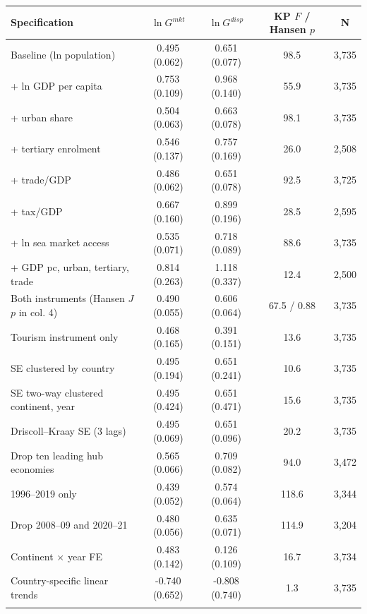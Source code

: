 \begin{tabular}{lcccc}
\toprule
Specification & $\ln G^{mkt}$ & $\ln G^{disp}$ & KP $F$ / Hansen $p$ & N \\
\midrule
Baseline (ln population) & 0.495\sym{***} (0.062) & 0.651\sym{***} (0.077) & 98.5 & 3,735 \\
+ ln GDP per capita & 0.753\sym{***} (0.109) & 0.968\sym{***} (0.140) & 55.9 & 3,735 \\
+ urban share & 0.504\sym{***} (0.063) & 0.663\sym{***} (0.078) & 98.1 & 3,735 \\
+ tertiary enrolment & 0.546\sym{***} (0.137) & 0.757\sym{***} (0.169) & 26.0 & 2,508 \\
+ trade/GDP & 0.486\sym{***} (0.062) & 0.651\sym{***} (0.078) & 92.5 & 3,725 \\
+ tax/GDP & 0.667\sym{***} (0.160) & 0.899\sym{***} (0.196) & 28.5 & 2,595 \\
+ ln sea market access & 0.535\sym{***} (0.071) & 0.718\sym{***} (0.089) & 88.6 & 3,735 \\
+ GDP pc, urban, tertiary, trade & 0.814\sym{***} (0.263) & 1.118\sym{***} (0.337) & 12.4 & 2,500 \\
Both instruments (Hansen $J$ $p$ in col. 4) & 0.490\sym{***} (0.055) & 0.606\sym{***} (0.064) & 67.5 / 0.88 & 3,735 \\
Tourism instrument only & 0.468\sym{***} (0.165) & 0.391\sym{***} (0.151) & 13.6 & 3,735 \\
SE clustered by country & 0.495\sym{**} (0.194) & 0.651\sym{***} (0.241) & 10.6 & 3,735 \\
SE two-way clustered continent, year & 0.495 (0.424) & 0.651 (0.471) & 15.6 & 3,735 \\
Driscoll--Kraay SE (3 lags) & 0.495\sym{***} (0.069) & 0.651\sym{***} (0.096) & 20.2 & 3,735 \\
Drop ten leading hub economies & 0.565\sym{***} (0.066) & 0.709\sym{***} (0.082) & 94.0 & 3,472 \\
1996--2019 only & 0.439\sym{***} (0.052) & 0.574\sym{***} (0.064) & 118.6 & 3,344 \\
Drop 2008--09 and 2020--21 & 0.480\sym{***} (0.056) & 0.635\sym{***} (0.071) & 114.9 & 3,204 \\
Continent $\times$ year FE & 0.483\sym{***} (0.142) & 0.126 (0.109) & 16.7 & 3,734 \\
Country-specific linear trends & -0.740 (0.652) & -0.808 (0.740) & 1.3 & 3,735 \\
\addlinespace\multicolumn{5}{l}{\emph{Leave-one-continent-out (country and year FE)}}\\

\end{tabular}
